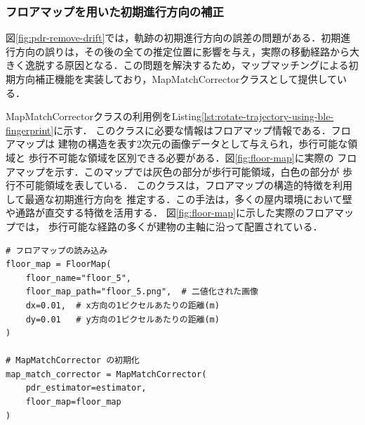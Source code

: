 

\subsubsection{フロアマップを用いた初期進行方向の補正}

図\ref{fig:pdr-remove-drift}では，軌跡の初期進行方向の誤差の問題がある．初期進行方向の誤りは，その後の全ての推定位置に影響を与え，実際の移動経路から大きく逸脱する原因となる．この問題を解決するため，マップマッチングによる初期方向補正機能を実装しており，MapMatchCorrectorクラスとして提供している．

MapMatchCorrectorクラスの利用例をListing\ref{lst:rotate-trajectory-using-ble-fingerprint}に示す．
このクラスに必要な情報はフロアマップ情報である．フロアマップは
建物の構造を表す2次元の画像データとして与えられ，歩行可能な領域と
歩行不可能な領域を区別できる必要がある．図\ref{fig:floor-map}に実際の
フロアマップを示す．このマップでは灰色の部分が歩行可能領域，白色の部分が
歩行不可能領域を表している．
このクラスは，フロアマップの構造的特徴を利用して最適な初期進行方向を
推定する．この手法は，多くの屋内環境において壁や通路が直交する特徴を活用する．
図\ref{fig:floor-map}に示した実際のフロアマップでは，
歩行可能な経路の多くが建物の主軸に沿って配置されている．

\begin{lstlisting}[caption={MapMatchCorrectorの使用例},label=lst:rotate-trajectory-using-ble-fingerprint,float=ht]
# フロアマップの読み込み
floor_map = FloorMap(
    floor_name="floor_5",
    floor_map_path="floor_5.png",  # 二値化された画像
    dx=0.01,  # x方向の1ピクセルあたりの距離(m)
    dy=0.01   # y方向の1ピクセルあたりの距離(m)
)

# MapMatchCorrector の初期化
map_match_corrector = MapMatchCorrector(
    pdr_estimator=estimator,
    floor_map=floor_map
)
\end{lstlisting}


